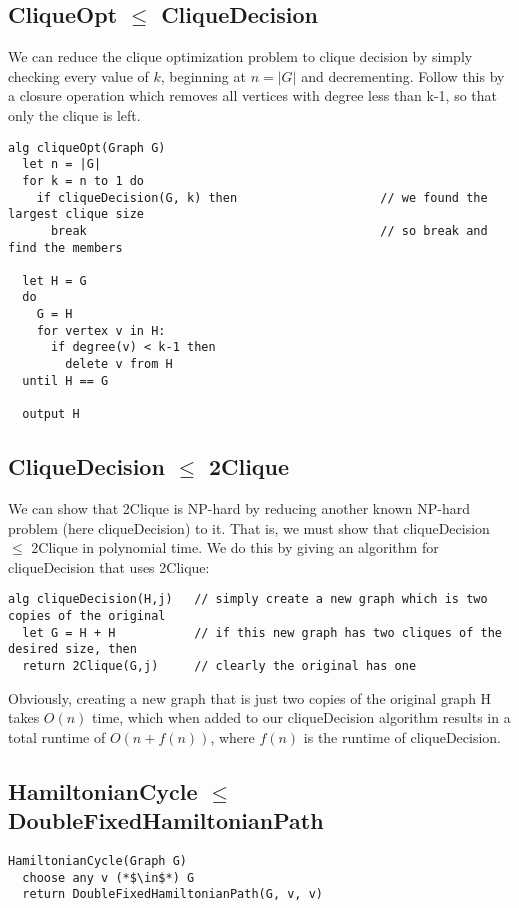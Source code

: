 \documentclass[12pt]{article}
\providecommand{\reducible}[2]{
  \textbf{#1} $\leq$ \textbf{#2}
}
\begin{document}
\subsection{\reducible{CliqueOpt}{CliqueDecision}}
We can reduce the clique optimization problem to clique decision by simply checking every value of $k$,
beginning at $n = |G|$ and decrementing.
Follow this by a closure operation which removes all vertices with degree less than k-1,
so that only the clique is left.
\begin{lstlisting}
alg cliqueOpt(Graph G)
  let n = |G|
  for k = n to 1 do
    if cliqueDecision(G, k) then                    // we found the largest clique size
      break                                         // so break and find the members

  let H = G
  do
    G = H
    for vertex v in H:
      if degree(v) < k-1 then
        delete v from H
  until H == G

  output H
\end{lstlisting}

\subsection{\reducible{CliqueDecision}{2Clique}}
We can show that 2Clique is NP-hard by reducing another known NP-hard problem (here cliqueDecision) to it.
That is, we must show that cliqueDecision $\leq$ 2Clique in polynomial time.
We do this by giving an algorithm for cliqueDecision that uses 2Clique:
\begin{lstlisting}
alg cliqueDecision(H,j)   // simply create a new graph which is two copies of the original
  let G = H + H           // if this new graph has two cliques of the desired size, then
  return 2Clique(G,j)     // clearly the original has one
\end{lstlisting}
Obviously, creating a new graph that is just two copies of the original graph H takes $O(n)$ time, which when added to our cliqueDecision algorithm results in a total runtime of $O(n + f(n))$, where $f(n)$ is the runtime of cliqueDecision.


\subsection{\reducible{HamiltonianCycle}{DoubleFixedHamiltonianPath}}
\begin{lstlisting}
HamiltonianCycle(Graph G)
  choose any v (*$\in$*) G
  return DoubleFixedHamiltonianPath(G, v, v)
\end{lstlisting}
\end{document}
